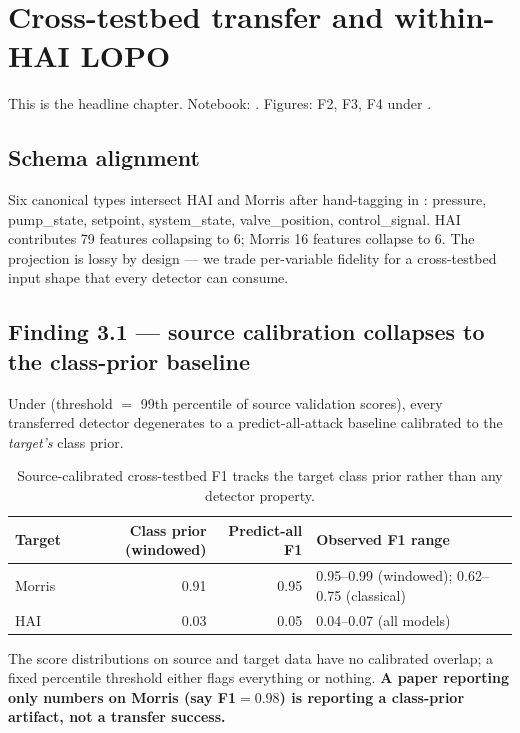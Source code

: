\section{Cross-testbed transfer and within-HAI LOPO}
\label{ch:results-transfer}

This is the headline chapter.  Notebook: .  Figures: F2, F3, F4 under .

\subsection{Schema alignment}

Six canonical types intersect HAI and Morris after hand-tagging in : pressure, pump\_state, setpoint, system\_state, valve\_position, control\_signal.  HAI contributes 79 features collapsing to 6; Morris 16 features collapse to 6.  The projection is lossy by design --- we trade per-variable fidelity for a cross-testbed input shape that every detector can consume.

\subsection{Finding 3.1 --- source calibration collapses to the class-prior baseline}
\label{sec:finding-src-cal}

Under  (threshold $= $ 99th percentile of source validation scores), every transferred detector degenerates to a predict-all-attack baseline calibrated to the \emph{target's} class prior.

\begin{table}[h]
\centering
\caption{Source-calibrated cross-testbed F1 tracks the target class prior rather than any detector property.}
\small
\begin{tabular}{lrrl}
\toprule
Target & Class prior (windowed) & Predict-all F1 & Observed F1 range \\
\midrule
Morris & 0.91 & 0.95 & 0.95--0.99 (windowed); 0.62--0.75 (classical) \\
HAI    & 0.03 & 0.05 & 0.04--0.07 (all models) \\
\bottomrule
\end{tabular}
\end{table}

The score distributions on source and target data have no calibrated overlap; a fixed percentile threshold either flags everything or nothing.  \textbf{A paper reporting only  numbers on Morris (say F1$=0.98$) is reporting a class-prior artifact, not a transfer success.}

